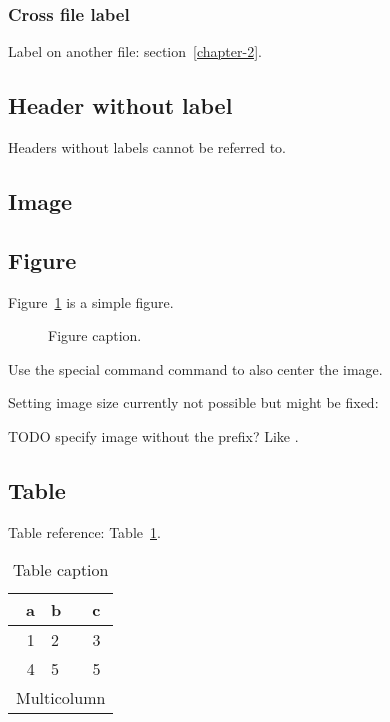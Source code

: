     \subsubsection{Cross file label}

      Label on another file: section~\ref{chapter-2}.

    \subsection{Header without label}

      Headers without labels cannot be referred to.

  \subsection{Image}

  \subsection{Figure}

    Figure~\ref{fig-simple} is a simple figure.

    \begin{figure}
      \caption{Figure caption.}
      \label{fig-simple}
    \end{figure}

    Use the special command  command to also center the image.

    Setting image size currently not possible but might be fixed: %

    TODO specify image without the  prefix? Like . %


  \subsection{Table}

    Table reference: Table~\ref{table}.

    \begin{table}
      \caption{Table caption}
      \label{table}
      \begin{tabular}{|r|lc|}
          \hline
          a & b & c \\
          \hline
          1 & 2 & 3 \\
          4 & 5 & 5 \\
          \hline
          \multicolumn{3}{|c|}{Multicolumn} \\
          \hline
        \end{tabular}
    \end{table}

